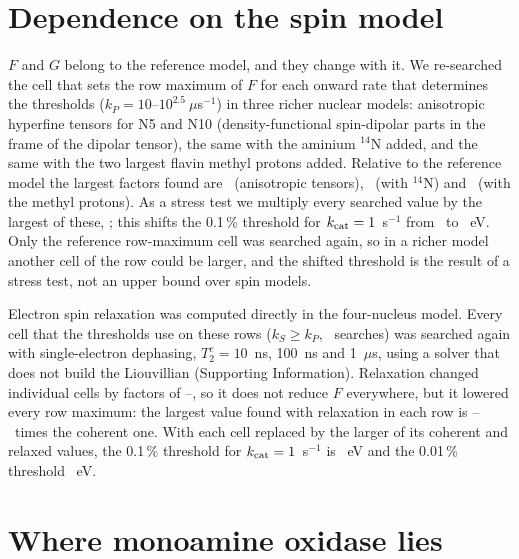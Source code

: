 \documentclass[journal=jpcbfk,manuscript=article,layout=traditional]{achemso}
\begin{document}
\section{Dependence on the spin model}
\label{sec:sens}

$F$ and $G$ belong to the reference model, and they change with it. We
re-searched the cell that sets the row maximum of $F$ for each onward rate that
determines the thresholds ($k_P = 10$--$10^{2.5}~\mu$s$^{-1}$) in three richer
nuclear models: anisotropic hyperfine tensors for N5 and N10 (density-functional
spin-dipolar parts in the frame of the dipolar tensor), the same with the
aminium $^{14}$N added, and the same with the two largest flavin methyl protons
added. Relative to the reference model the largest factors found are
\XanisoMax\ (anisotropic tensors), \XanisoNMax\ (with $^{14}$N) and
\XanisoHMax\ (with the methyl protons). As a stress test we multiply every
searched value by the largest of these, \Xsens; this shifts the 0.1\,\%
threshold for $k_{\rm cat}=1$~s$^{-1}$ from \ThrTenthOne\ to
\ThrTenthOneSens~eV. Only the reference row-maximum cell was searched again, so
in a richer model another cell of the row could be larger, and the shifted
threshold is the result of a stress test, not an upper bound over spin models.

Electron spin relaxation was computed directly in the four-nucleus model. Every
cell that the thresholds use on these rows ($k_S\ge k_P$, \nTtwoCells\ searches)
was searched again with single-electron dephasing, $T_2^e = 10$~ns, 100~ns and
1~$\mu$s, using a solver that does not build the Liouvillian (Supporting
Information). Relaxation changed individual cells by factors of
\TtwoCellMin--\TtwoCellMax, so it does not reduce $F$ everywhere, but it lowered
every row maximum: the largest value found with relaxation in each row is
\TtwoRowMin--\TtwoRowMax\ times the coherent one. With
each cell replaced by the larger of its coherent and relaxed values, the 0.1\,\%
threshold for $k_{\rm cat}=1$~s$^{-1}$ is \ThrTenthOneRelax~eV and the
0.01\,\% threshold \ThrHundredthOneRelax~eV.

\section{Where monoamine oxidase lies}
\label{sec:mao}
\end{document}
